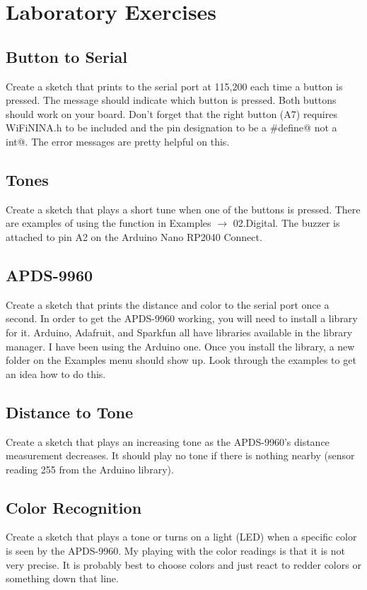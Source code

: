 \section{Laboratory Exercises}
\subsection{Button to Serial}
Create a sketch that prints to the serial port at 115,200 each time a button is pressed. The message should indicate which
button is pressed. Both buttons should work on your board. Don't forget that the right button (A7) requires WiFiNINA.h to
be included and the pin designation to be a \lstinline@#define@ not a \lstinline@const int@. The error messages are pretty helpful on this.

\subsection{Tones}
Create a sketch that plays a short tune when one of the buttons is pressed. There are examples of using the \lstinline@tone@ 
function in Examples $\rightarrow$ 02.Digital. The buzzer is attached to pin A2 on the Arduino Nano RP2040 Connect.

\subsection{APDS-9960}
Create a sketch that prints the distance and color to the serial port once a second. In order to get the APDS-9960 working,
you will need to install a library for it. Arduino, Adafruit, and Sparkfun all have libraries available in the library 
manager. I have been using the Arduino one. Once you install the library, a new folder on the Examples menu should show up. 
Look through the examples to get an idea how to do this. 

\subsection{Distance to Tone}
Create a sketch that plays an increasing tone as the APDS-9960's distance measurement decreases. It should play 
no tone if there is nothing nearby (sensor reading 255 from the Arduino library). 

\subsection{Color Recognition}
Create a sketch that plays a tone or turns on a light (LED) when a specific color is seen by the APDS-9960. My playing with 
the color readings is that it is not very precise. It is probably best to choose colors and just react to redder colors or 
something down that line.

